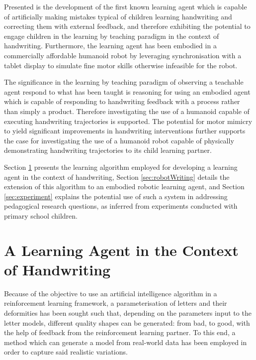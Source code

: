 \documentclass{sig-alternate}
\begin{document}
Presented is the development of the first known learning agent which is capable
of artificially making mistakes typical of children learning handwriting and
correcting them with external feedback, and therefore exhibiting the potential
to engage children in the learning by teaching paradigm in the context of
handwriting. Furthermore, the learning agent has been embodied in a commercially
affordable humanoid robot by leveraging synchronisation with a tablet display to
simulate fine motor skills otherwise infeasible for the robot. 

The significance in the learning by teaching paradigm of observing a teachable
agent respond to what has been taught \cite{Okita2006} is reasoning for using an
embodied agent which is capable of responding to handwriting feedback with a
process rather than simply a product. Therefore investigating the use of a
humanoid capable of executing handwriting trajectories is supported. The
potential for motor mimicry to yield significant improvements in handwriting
interventions \cite{Berninger1997} further supports the case for investigating
the use of a humanoid robot capable of physically demonstrating handwriting
trajectories to its child learning partner.

Section \ref{sec:learningAlgorithm} presents the learning algorithm employed for
developing a learning agent in the context of handwriting, Section
\ref{sec:robotWriting} details the extension of this algorithm to an embodied
robotic learning agent, and Section \ref{sec:experiment} explains the potential
use of such a system in addressing pedagogical research questions, as inferred
from experiments conducted with primary school children. 



\section{A Learning Agent in the Context of Handwriting} \label{sec:learningAlgorithm}

Because of the objective to use an artificial intelligence algorithm in a
reinforcement learning framework, a parameterisation of letters and their
deformities has been sought such that, depending on the parameters input to the
letter models, different quality shapes can be generated: from bad, to good,
with the help of feedback from the reinforcement learning partner. To this end,
a method which can generate a model from real-world data has been employed in
order to capture said realistic variations. 
\end{document}
